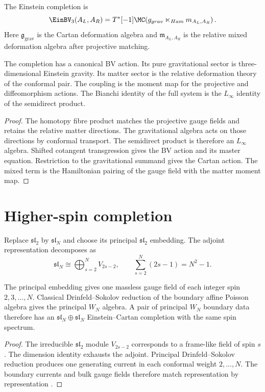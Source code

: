 \begin{definition}
The Einstein completion is
\[
 \EinBV_3(A_L,A_R)
 =T^*[-1]\MC\!\left(
   \mathfrak g_{\mathrm{grav}}
   \ltimes_{\mathrm{Ham}}
   \mathfrak m_{A_L,A_R}
  \right).
\]
Here $\mathfrak g_{\mathrm{grav}}$ is the Cartan deformation algebra and $\mathfrak m_{A_L,A_R}$ is the relative mixed deformation algebra after projective matching.
\end{definition}

\begin{theorem}
The completion has a canonical BV action.  Its pure gravitational sector is three-dimensional Einstein gravity.  Its matter sector is the relative deformation theory of the conformal pair.  The coupling is the moment map for the projective and diffeomorphism actions.  The Bianchi identity of the full system is the $L_\infty$ identity of the semidirect product.
\end{theorem}
\begin{proof}
The homotopy fibre product matches the projective gauge fields and retains the relative matter directions.  The gravitational algebra acts on those directions by conformal transport.  The semidirect product is therefore an $L_\infty$ algebra.  Shifted cotangent transgression gives the BV action and its master equation.  Restriction to the gravitational summand gives the Cartan action.  The mixed term is the Hamiltonian pairing of the gauge field with the matter moment map.
\end{proof}

\chapter{Higher-spin completion}
Replace $\mathfrak{sl}_2$ by $\mathfrak{sl}_N$ and choose its principal $\mathfrak{sl}_2$ embedding.  The adjoint representation decomposes as
\[
 \mathfrak{sl}_N
 \cong\bigoplus_{s=2}^{N}V_{2s-2},
 \qquad
 \sum_{s=2}^{N}(2s-1)=N^2-1.
\]

\begin{theorem}
The principal embedding gives one massless gauge field of each integer spin $2,3,\ldots,N$.  Classical Drinfeld--Sokolov reduction of the boundary affine Poisson algebra gives the principal $W_N$ algebra.  A pair of principal $W_N$ boundary data therefore has an $\mathfrak{sl}_N\oplus\mathfrak{sl}_N$ Einstein--Cartan completion with the same spin spectrum.
\end{theorem}
\begin{proof}
The irreducible $\mathfrak{sl}_2$ module $V_{2s-2}$ corresponds to a frame-like field of spin $s$.  The dimension identity exhausts the adjoint.  Principal Drinfeld--Sokolov reduction produces one generating current in each conformal weight $2,\ldots,N$.  The boundary currents and bulk gauge fields therefore match representation by representation 
\cite{CampoleoniHigherSpin,HenneauxRey}.
\end{proof}



